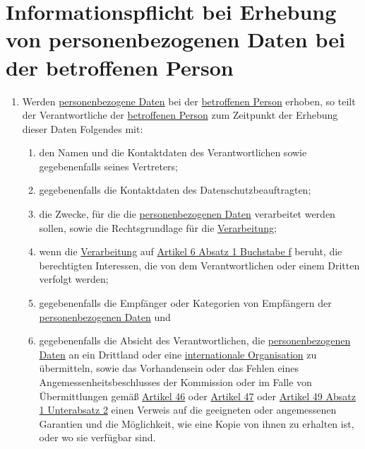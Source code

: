 \chapter{Informationspflicht bei Erhebung von personenbezogenen Daten bei der betroffenen Person}
\label{ch:13}


\begin{enumerate}

  \item Werden \hyperref[itm:04-1]{personenbezogene Daten} bei der \hyperref[itm:04-1]{betroffenen Person} erhoben, so teilt der Verantwortliche der \hyperref[itm:04-1]{betroffenen
   Person} zum Zeitpunkt der Erhebung dieser Daten Folgendes mit:
  \label{itm:13-1}

  \begin{enumerate}
  
    \item den Namen und die Kontaktdaten des Verantwortlichen sowie gegebenenfalls seines Vertreters;
    \label{itm:13-1a}

    \item gegebenenfalls die Kontaktdaten des Datenschutzbeauftragten;
    \label{itm:13-1b}

    \item die Zwecke, für die die \hyperref[itm:04-1]{personenbezogenen Daten} verarbeitet werden sollen, sowie die Rechtsgrundlage für die
     \hyperref[itm:04-2]{Verarbeitung};
    \label{itm:13-1c}

    \item wenn die \hyperref[itm:04-2]{Verarbeitung} auf \hyperref[itm:06-1f]{Artikel 6 Absatz 1 Buchstabe f} beruht, die berechtigten
     Interessen, die von dem Verantwortlichen oder einem Dritten verfolgt werden;
    \label{itm:13-1d}

    \item gegebenenfalls die Empfänger oder Kategorien von Empfängern der \hyperref[itm:04-1]{personenbezogenen Daten} und
    \label{itm:13-1e}

    \item gegebenenfalls die Absicht des Verantwortlichen, die \hyperref[itm:04-1]{personenbezogenen Daten} an ein Drittland oder eine
     \hyperref[itm:04-29]{internationale Organisation} zu übermitteln, sowie das Vorhandensein oder das Fehlen eines
     Angemessenheitsbeschlusses der Kommission oder im Falle von Übermittlungen gemäß \hyperref[ch:46]{Artikel 46} oder
     \hyperref[ch:47]{Artikel 47} oder \hyperref[itm:49-1-2]{Artikel 49 Absatz 1 Unterabsatz 2} einen Verweis auf die
      geeigneten oder angemessenen Garantien und die Möglichkeit, wie eine Kopie von ihnen zu erhalten ist, oder wo sie
      verfügbar sind.
    \label{itm:13-1f}


\end{enumerate}
\end{enumerate}
